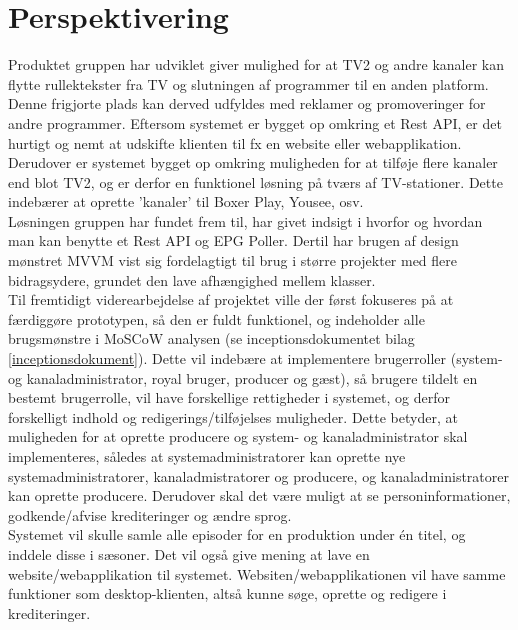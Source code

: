\section{Perspektivering}

Produktet gruppen har udviklet giver mulighed for at TV2 og andre kanaler kan flytte rullektekster fra TV og slutningen af programmer til en anden platform. Denne frigjorte plads kan derved udfyldes med reklamer og promoveringer for andre programmer. Eftersom systemet er bygget op omkring et Rest API, er det hurtigt og nemt at udskifte klienten til fx en website eller webapplikation. Derudover er systemet bygget op omkring muligheden for at tilføje flere kanaler end blot TV2, og er derfor en funktionel løsning på tværs af TV-stationer. Dette indebærer at oprette 'kanaler' til Boxer Play, Yousee, osv.\\
Løsningen gruppen har fundet frem til, har givet indsigt i hvorfor og hvordan man kan benytte et Rest API og EPG Poller. Dertil har brugen af design mønstret MVVM vist sig fordelagtigt til brug i større projekter med flere bidragsydere, grundet den lave afhængighed mellem klasser. \\

Til fremtidigt viderearbejdelse af projektet ville der først fokuseres på at færdiggøre prototypen, så den er fuldt funktionel, og indeholder alle brugsmønstre i MoSCoW analysen (se inceptionsdokumentet bilag \ref{inceptionsdokument}). Dette vil indebære at implementere brugerroller (system- og kanaladministrator, royal bruger, producer og gæst), så brugere tildelt en bestemt brugerrolle, vil have forskellige rettigheder i systemet, og derfor forskelligt indhold og redigerings/tilføjelses muligheder. Dette betyder, at muligheden for at oprette producere og system- og kanaladministrator skal implementeres, således at systemadministratorer kan oprette nye systemadministratorer, kanaladmistratorer og producere, og kanaladministratorer kan oprette producere.  Derudover skal det være muligt at se personinformationer, godkende/afvise krediteringer og ændre sprog. \\
Systemet vil skulle samle alle episoder for en produktion under én titel, og inddele disse i sæsoner.
Det vil også give mening at lave en website/webapplikation til systemet. Websiten/webapplikationen vil have samme funktioner som desktop-klienten, altså kunne søge, oprette og redigere i krediteringer. \\


